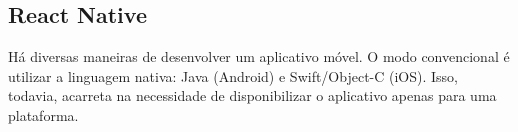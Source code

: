 \subsection{React Native} 

Há diversas maneiras de desenvolver um aplicativo móvel. O modo convencional é utilizar a linguagem nativa: Java (Android) e Swift/Object-C (iOS). Isso, todavia, acarreta na necessidade de disponibilizar o aplicativo apenas para uma plataforma. 


